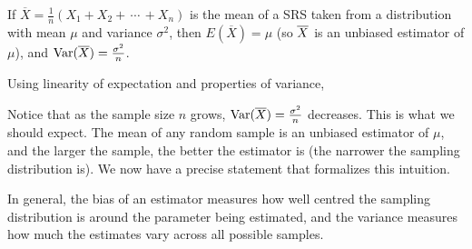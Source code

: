 \begin{thm}\label{BiasVarianceSampleMean}\label{StandardErrorOfMean}
If $\overline{X} = \frac{1}{n}(X_1+X_2+\,\cdots\,+X_n)$ is the mean of a SRS taken from a distribution with mean $\mu$ and variance $\sigma^2$, then $E(\overline{X}) = \mu$ (so ${\overline{X}}$ is an unbiased estimator of $\mu$), and $\operatorname{Var}(\overline{X}) = \frac{\sigma^2}{n}$.
\end{thm}
\begin{pf} Using linearity of expectation and properties of variance,
\par
{}
\end{pf}

\par
Notice that as the sample size $n$ grows, $\operatorname{Var}(\overline{X}) = \frac{\sigma^2}{n}$ decreases. This is what we should expect. The mean of any random sample is an unbiased estimator of $\mu$, and the larger the sample, the better the estimator is (the narrower the sampling distribution is). We now have a precise statement that formalizes this intuition.

\par
In general, the bias of an estimator measures how well centred the sampling distribution is around the parameter being estimated, and the variance measures how much the estimates vary across all possible samples.

